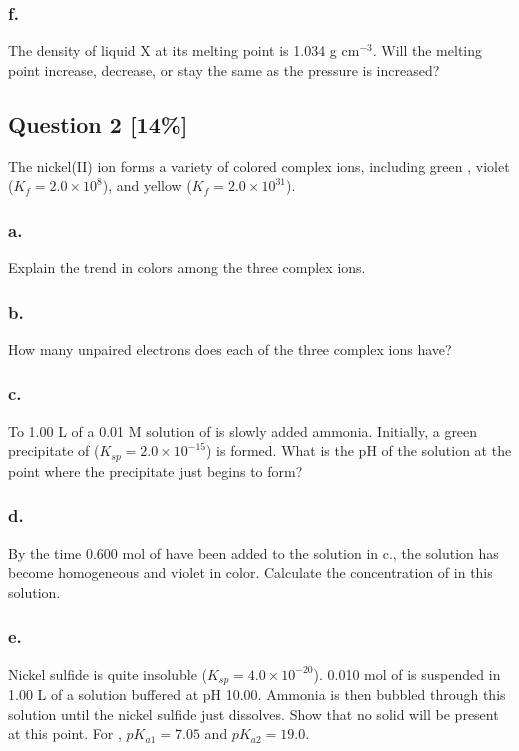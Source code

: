 \documentclass[11pt,letterpaper]{article}
\begin{document}
\subsubsection*{f.}
The density of liquid X at its melting point is 1.034 g $\text{cm}^{-3}$. Will the melting point increase, decrease, or stay the same as the pressure is increased?
\vspace{4cm}

\newpage
\subsection*{Question 2 [14\%]}
The nickel(II) ion forms a variety of colored complex ions, including green , violet  ($K_f = 2.0 \times 10^8$), and yellow  ($K_f = 2.0 \times 10^{31}$).

\subsubsection*{a.}
Explain the trend in colors among the three complex ions.
\vspace{4cm}

\subsubsection*{b.}
How many unpaired electrons does each of the three complex ions have?
\vspace{4cm}

\subsubsection*{c.}
To 1.00 L of a 0.01 M solution of  is slowly added ammonia. Initially, a green precipitate of  ($K_{sp} = 2.0 \times 10^{-15}$) is formed. What is the pH of the solution at the point where the precipitate just begins to form?
\vspace{4cm}

\subsubsection*{d.}
By the time 0.600 mol of  have been added to the solution in c., the solution has become homogeneous and violet in color. Calculate the concentration of  in this solution.
\vspace{4cm}

\newpage
\subsubsection*{e.}
Nickel sulfide is quite insoluble ($K_{sp} = 4.0 \times 10^{-20}$). 0.010 mol of  is suspended in 1.00 L of a solution buffered at pH 10.00. Ammonia is then bubbled through this solution until the nickel sulfide just dissolves. Show that no solid  will be present at this point. For , $pK_{a1} = 7.05$ and $pK_{a2} = 19.0$.
\vspace{5cm}
\end{document}
